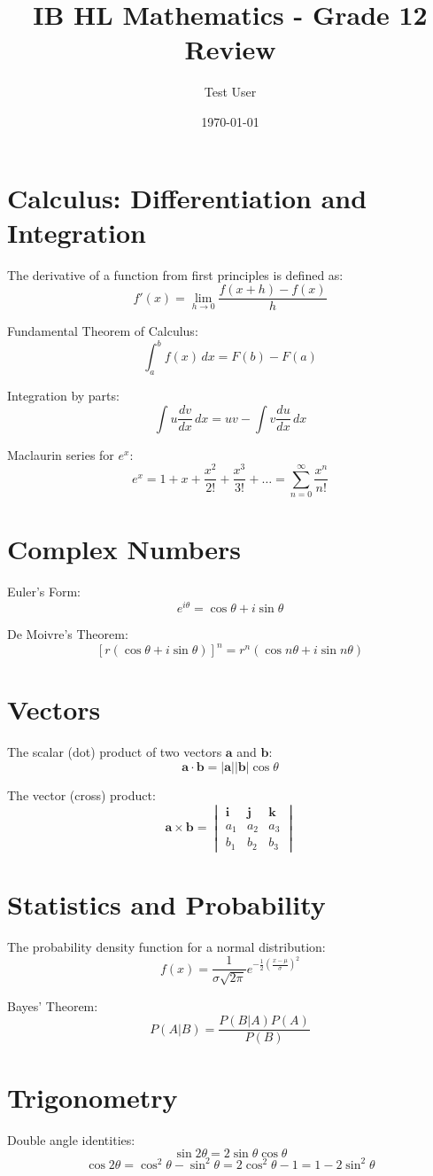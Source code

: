 \documentclass{article}
\title{IB HL Mathematics - Grade 12 Review}
\author{Test User}
\date{\today}
\begin{document}
\maketitle

\section{Calculus: Differentiation and Integration}
The derivative of a function from first principles is defined as:
\[ f'(x) = \lim_{h \to 0} \frac{f(x+h) - f(x)}{h} \]

Fundamental Theorem of Calculus:
\[ \int_{a}^{b} f(x) \, dx = F(b) - F(a) \]

Integration by parts:
\[ \int u \frac{dv}{dx} \, dx = uv - \int v \frac{du}{dx} \, dx \]

Maclaurin series for $e^x$:
\[ e^x = 1 + x + \frac{x^2}{2!} + \frac{x^3}{3!} + \dots = \sum_{n=0}^{\infty} \frac{x^n}{n!} \]

\section{Complex Numbers}
Euler's Form:
\[ e^{i\theta} = \cos \theta + i \sin \theta \]

De Moivre's Theorem:
\[ [r(\cos \theta + i \sin \theta)]^n = r^n(\cos n\theta + i \sin n\theta) \]

\section{Vectors}
The scalar (dot) product of two vectors $\mathbf{a}$ and $\mathbf{b}$:
\[ \mathbf{a} \cdot \mathbf{b} = |\mathbf{a}| |\mathbf{b}| \cos \theta \]

The vector (cross) product:
\[ \mathbf{a} \times \mathbf{b} = \begin{vmatrix} 
\mathbf{i} & \mathbf{j} & \mathbf{k} \\
a_1 & a_2 & a_3 \\
b_1 & b_2 & b_3 
\end{vmatrix} \]

\section{Statistics and Probability}
The probability density function for a normal distribution:
\[ f(x) = \frac{1}{\sigma \sqrt{2\pi}} e^{-\frac{1}{2}\left(\frac{x-\mu}{\sigma}\right)^2} \]

Bayes' Theorem:
\[ P(A|B) = \frac{P(B|A)P(A)}{P(B)} \]

\section{Trigonometry}
Double angle identities:
\[ \sin 2\theta = 2\sin\theta\cos\theta \]
\[ \cos 2\theta = \cos^2\theta - \sin^2\theta = 2\cos^2\theta - 1 = 1 - 2\sin^2\theta \]
\end{document}
